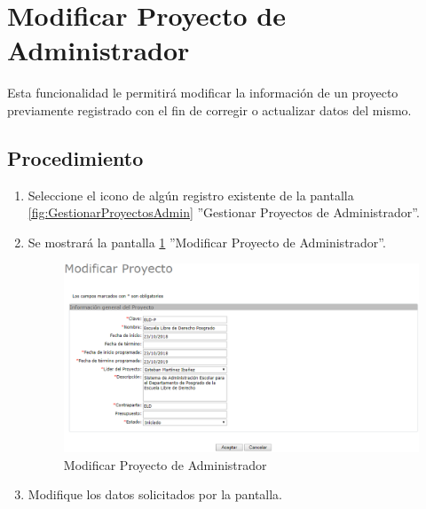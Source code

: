 \hypertarget{cv:modificarProyecto}{\section{Modificar Proyecto de Administrador}} \label{sec:modificarProyecto}

	Esta funcionalidad le permitirá modificar la información de un proyecto previamente registrado con el fin de corregir o actualizar datos del mismo.

		\subsection{Procedimiento}

			\begin{enumerate}
	
			\item Seleccione el icono \IUEditar{} de algún registro existente de la pantalla \ref{fig:GestionarProyectosAdmin} ''Gestionar Proyectos de Administrador''.
			
			\item Se mostrará la pantalla \ref{fig:modificarProyecto} ''Modificar Proyecto de Administrador''.

			\begin{figure}[htbp!]
				\begin{center}
					\includegraphics[scale=0.6]{roles/administrador/proyectosAdmin/gestionarproyectosAdmin/pantallas/IU2-2modificarProyecto}
					\caption{Modificar Proyecto de Administrador}
					\label{fig:modificarProyecto}
				\end{center}
			\end{figure}
		
			\item Modifique los datos solicitados por la pantalla.
			

\end{enumerate}
